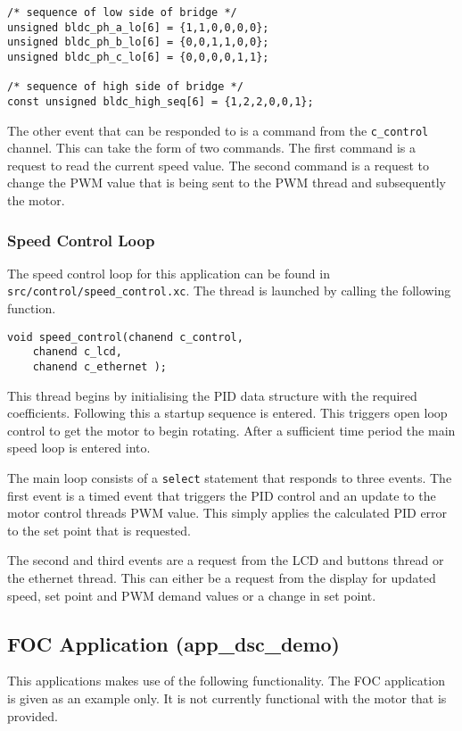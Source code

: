 \begin{lstlisting}
/* sequence of low side of bridge */
unsigned bldc_ph_a_lo[6] = {1,1,0,0,0,0};
unsigned bldc_ph_b_lo[6] = {0,0,1,1,0,0};
unsigned bldc_ph_c_lo[6] = {0,0,0,0,1,1};

/* sequence of high side of bridge */
const unsigned bldc_high_seq[6] = {1,2,2,0,0,1};
\end{lstlisting}

The other event that can be responded to is a command from the \verb=c_control= channel. This can take the form of two commands. The first command is a request to read the current speed value. The second command is a request to change the PWM value that is being sent to the PWM thread and subsequently the motor.

\subsubsection{Speed Control Loop}
The speed control loop for this application can be found in \newline
\verb=src/control/speed_control.xc=. The thread is launched by calling the following function.

\begin{lstlisting}
void speed_control(chanend c_control, 
	chanend c_lcd, 
	chanend c_ethernet );
\end{lstlisting}

This thread begins by initialising the PID data structure with the required coefficients. Following this a startup sequence is entered. This triggers open loop control to get the motor to begin rotating. After a sufficient time period the main speed loop is entered into.

The main loop consists of a \verb=select= statement that responds to three events. The first event is a timed event that triggers the PID control and an update to the motor control threads PWM value. This simply applies the calculated PID error to the set point that is requested.

The second and third events are a request from the LCD and buttons thread or the ethernet thread. This can either be a request from the display for updated speed, set point and PWM demand values or a change in set point. 

\subsection{FOC Application (app\_dsc\_demo)}
This applications makes use of the following functionality. The FOC application is given as an example only. It is not currently functional with the motor that is provided.

